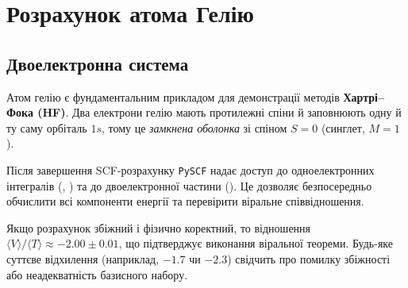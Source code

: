 
\section{Розрахунок атома Гелію}

\subsection{Двоелектронна система}

Атом гелію є фундаментальним прикладом для демонстрації методів \textbf{Хартрі–Фока (HF)}. Два електрони гелію мають протилежні спіни й заповнюють одну й ту саму орбіталь $1s$, тому це \emph{замкнена оболонка}
зі спіном $S = 0$ (синглет, $M = 1$).


Після завершення SCF-розрахунку \texttt{PySCF} надає доступ до одноелектронних інтегралів
(, ) та до двоелектронної частини ().
Це дозволяє безпосередньо обчислити всі компоненти енергії та перевірити віральне співвідношення.


\begin{commentbox}
    Якщо розрахунок збіжний і фізично коректний, то відношення
    \(\langle V \rangle / \langle T \rangle \approx -2.00 \pm 0.01\),
    що підтверджує виконання віральної теореми.
    Будь-яке суттєве відхилення (наприклад, $-1.7$ чи $-2.3$) свідчить про помилку збіжності або неадекватність базисного набору.
\end{commentbox}

%
%
%
%


